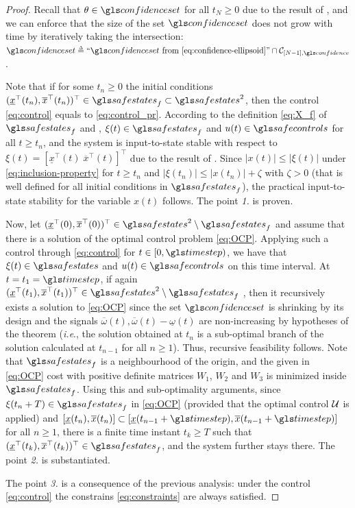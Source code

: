 \begin{proof}
	Recall that $\theta\in\confidenceset$ for all $t_N\geq 0$ due to the
	result of , and we can enforce that the size of the set $\confidenceset$
	does not grow with time by iteratively taking the intersection: $\confidenceset \eqdef ``\confidenceset\text{ from \eqref{eq:confidence-ellipsoid}}" \cap \cC_{[N-1],\confidence}$.
	
	Note that if for some $t_{n}\geq0$ the initial conditions $(\underline{x}^{\top}(t_{n}),\overline{x}^{\top}(t_{n}))^{\top}\in\safestates_{f}\subset\safestates^{2}$,
	then the control \eqref{eq:control} equals to \eqref{eq:control_pr}.
	According to the definition \eqref{eq:X_f} of $\safestates_{f}$ and , $\xi(t)\in\safestates_{f}$ and $u(t)\in\safecontrols$ for all $t\geq t_{n}$,
	and the system is input-to-state stable with respect to $\xi(t)=[\underline{x}^{\top}(t)\;\overline{x}^{\top}(t)]^{\top}$
	due to the result of . Since $|x(t)|\leq|\xi(t)|$
	under \eqref{eq:inclusion-property} for $t\geq t_{n}$ and $|\xi(t_{n})|\leq|x(t_{n})|+\zeta$
	with $\zeta>0$ (that is well defined for all initial conditions in
	$\safestates_{f}$), the practical input-to-state stability for the variable
	$x(t)$ follows. The point \emph{1.} is proven.
	
	Now, let $(\underline{x}^{\top}(0),\overline{x}^{\top}(0))^{\top}\in\safestates^{2}\setminus\safestates_{f}$
	and assume that there is a solution of the optimal control problem
	\eqref{eq:OCP}. Applying such a control through \eqref{eq:control}
	for $t\in[0,\timestep)$, we have that $\xi(t)\in\safestates$ and $u(t)\in\safecontrols$
	on this time interval. At $t=t_{1}=\timestep$, if again $(\underline{x}^{\top}(t_{1}),\overline{x}^{\top}(t_{1}))^{\top}\in\safestates^{2}\setminus\safestates_{f}$
	, then it recursively exists a solution to
	\eqref{eq:OCP} since the set $\confidenceset$ is shrinking by its
	design and the signals $\overline{\omega}(t),\overline{\omega}(t)-\underline{\omega}(t)$
	are non-increasing by hypotheses of the theorem (\emph{i.e}., the
	solution obtained at $t_{n}$ is a sub-optimal branch of the solution
	calculated at $t_{n-1}$ for all $n\geq1$). Thus, recursive feasibility
	follows. Note that $\safestates_{f}$ is a neighbourhood of the origin, and
	the given in \eqref{eq:OCP} cost with positive definite matrices
	$W_{1}$, $W_{2}$ and $W_{3}$ is minimized inside $\safestates_{f}$. Using
	this and sub-optimality arguments, since $\xi(t_{n}+T)\in\safestates_{f}$
	in \eqref{eq:OCP} (provided that the optimal control $\mathcal{U}$ is applied)
	and $[\underline{x}(t_{n}),\overline{x}(t_{n})]\subset[\underline{x}(t_{n-1}+\timestep),\overline{x}(t_{n-1}+\timestep)]$
	for all $n\geq1$, there is a finite time instant $t_{k}\geq T$ such
	that $(\underline{x}^{\top}(t_{k}),\overline{x}^{\top}(t_{k}))^{\top}\in\safestates_{f}$,
	and the system further stays there. The point \emph{2.} is substantiated.
	
	The point \emph{3.} is a consequence of the previous analysis: under
	the control \eqref{eq:control} the constrains \eqref{eq:constraints}
	are always satisfied.
\end{proof}
